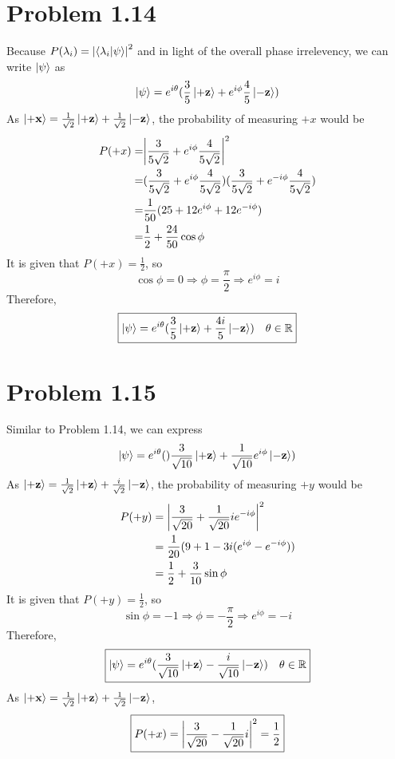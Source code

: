 \documentclass{article}
\begin{document}
\section*{Problem 1.14}
Because $P(\lambda_i) = \abs{\braket{\lambda_i}{\psi}}^2$ and in light of the overall phase irrelevency, we can write $\ket{\psi}$ as 
\[
    \ket{\psi} = e^{i\theta}
    (\frac{3}{5}\ket{\vb{+z}} + e^{i\phi} \frac{4}{5} \ket{\vb{-z}})
\]
As $\ket{\vb{+x}} = \frac{1}{\sqrt{2}} \ket{\vb{+z}} + \frac{1}{\sqrt{2}} \ket{\vb{-z}}$, the probability of measuring $+x$ would be 
\[
    \begin{split}
        P(+x)
        =& \abs{\frac{3}{5\sqrt{2}}+e^{i\phi}\frac{4}{5\sqrt{2}}}^2 \\
        =& (\frac{3}{5\sqrt{2}}+e^{i\phi}\frac{4}{5\sqrt{2}}) (\frac{3}{5\sqrt{2}}+e^{-i\phi}\frac{4}{5\sqrt{2}}) \\
        =& \frac{1}{50} (25+12e^{i\phi}+ 12e^{-i\phi}) \\
        =& \frac{1}{2} + \frac{24}{50} \cos{\phi}
    \end{split}
\]
It is given that $P(+x)=\frac{1}{2}$, so 
\[
    \cos{\phi} = 0 \Rightarrow 
    \phi = \frac{\pi}{2} \Rightarrow
    e^{i\phi} = i
\]
Therefore,
\[
    \boxed{
        \ket{\psi} = 
        e^{i\theta} (\frac{3}{5} \ket{\vb{+z}} + \frac{4i}{5} \ket{\vb{-z}})
        \quad \theta \in \mathbb{R}}
\]

\section*{Problem 1.15}
Similar to Problem 1.14, we can express
\[
    \ket{\psi}= e^{i\theta}
    ()\frac{3}{\sqrt{10}} \ket{\vb{+z}} + \frac{1}{\sqrt{10}}e^{i\phi}\ket{\vb{-z}})
\]
As $\ket{\vb{+z}} = \frac{1}{\sqrt{2}} \ket{\vb{+z}} + \frac{i}{\sqrt{2}} \ket{\vb{-z}} $, the probability of measuring $+y$ would be 
\[
    \begin{split}
        P(+y)
        &= \abs{\frac{3}{\sqrt{20}}+\frac{1}{\sqrt{20}}ie^{-i\phi}}^2 \\
        &= \frac{1}{20} (9+1-3i(e^{i\phi}-e^{-i\phi})) \\
        &= \frac{1}{2} + \frac{3}{10} \sin{\phi}
    \end{split}
\]
It is given that $P(+y) = \frac{1}{2}$, so
\[
    \sin{\phi} = -1 \Rightarrow
    \phi = -\frac{\pi}{2} \Rightarrow
    e^{i\phi} = -i
\]
Therefore,
\[  
    \boxed{
    \ket{\psi} = 
    e^{i\theta} (\frac{3}{\sqrt{10}} \ket{\vb{+z}} - \frac{i}{\sqrt{10}} \ket{\vb{-z}})
    \quad \theta \in \mathbb{R}
    } 
\]
As $\ket{\vb{+x}} = \frac{1}{\sqrt{2}} \ket{\vb{+z}} + \frac{1}{\sqrt{2}} \ket{\vb{-z}}$,
\[
    \boxed{
    P(+x) = 
    \abs{\frac{3}{\sqrt{20}}-\frac{1}{\sqrt{20}}i}^2
    = \frac{1}{2}
    }
\]
\end{document}
